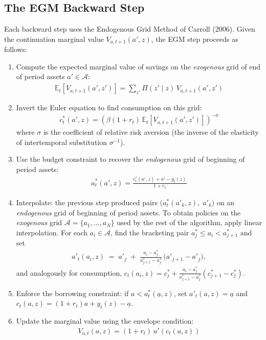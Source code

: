 \documentclass[12pt]{article}
\newcommand{\E}{\mathbb{E}}
\begin{document}
\subsection{The EGM Backward Step}

Each backward step uses the Endogenous Grid Method of Carroll (2006). Given the continuation marginal value $V_{a,t+1}(a', z)$, the EGM step proceeds as follows:
\begin{enumerate}[nosep]
    \item Compute the expected marginal value of savings on the \emph{exogenous} grid of end of period assets $a' \in \mathcal{A}$:
    \begin{align}
        \E_t\left[V_{a,t+1}(a', z')\right] = \sum_{z'} \Pi(z' \mid z) \, V_{a,t+1}(a', z') \label{eq:EVa}
    \end{align}

    \item Invert the Euler equation to find consumption on this grid:
    \begin{align}
        c_t^*(a', z) = \left(\beta (1 + r_t) \, \E_t\left[V_{a,t+1}(a', z')\right]\right)^{-\sigma} \label{eq:egm_euler}
    \end{align}
    where $\sigma$ is the coefficient of relative risk aversion (the inverse of the elasticity of intertemporal substitution $\sigma^{-1}$).

    \item Use the budget constraint to recover the \emph{endogenous} grid of beginning of period assets:
    \begin{align}
        a^*_t(a', z) = \frac{c_t^*(a', z) + a' - y_t(z)}{1 + r_t} \label{eq:egm_endogenous}
    \end{align}

    \item Interpolate: the previous step produced pairs $\bigl(a^*_t(a'_k, z),\; a'_k\bigr)$ on an \emph{endogenous} grid of beginning of period assets.  To obtain policies on the \emph{exogenous} grid $\mathcal{A} = \{a_1, \dots, a_N\}$ used by the rest of the algorithm, apply linear interpolation.  For each $a_i \in \mathcal{A}$, find the bracketing pair $a^*_j \leq a_i < a^*_{j+1}$ and set
    \begin{align}
        a'_t(a_i, z) \;=\; a'_j \;+\; \frac{a_i - a^*_j}{a^*_{j+1} - a^*_j}\,\bigl(a'_{j+1} - a'_j\bigr), \label{eq:egm_interp}
    \end{align}
    and analogously for consumption, $c_t(a_i, z) = c^*_j + \frac{a_i - a^*_j}{a^*_{j+1} - a^*_j}(c^*_{j+1} - c^*_j)$.

    \item Enforce the borrowing constraint: if $a < a^*_t(\underline{a}, z)$, set $a'_t(a, z) = \underline{a}$ and $c_t(a, z) = (1 + r_t) a + y_t(z) - \underline{a}$.

    \item Update the marginal value using the envelope condition:
    \begin{align}
        V_{a,t}(a, z) = (1 + r_t) \, u'(c_t(a, z)) \label{eq:envelope}
    \end{align}
\end{enumerate}
\end{document}
